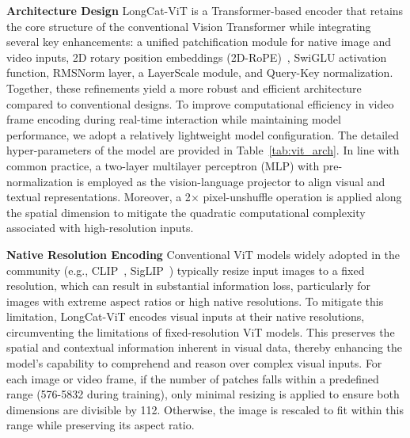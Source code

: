 \documentclass{article}
\begin{document}
\textbf{Architecture Design}
LongCat-ViT is a Transformer-based encoder that retains the core structure of the conventional Vision Transformer while integrating several key enhancements: a unified patchification module for native image and video inputs, 2D rotary position embeddings (2D-RoPE)~\citep{su2024roformer}, SwiGLU activation function, RMSNorm layer, a LayerScale module, and Query-Key normalization. Together, these refinements yield a more robust and efficient architecture compared to conventional designs.
To improve computational efficiency in video frame encoding during real-time interaction while maintaining model performance, we adopt a relatively lightweight model configuration.
The detailed hyper-parameters of the model are provided in Table~\ref{tab:vit_arch}.
In line with common practice, a two-layer multilayer perceptron (MLP) with pre-normalization is employed as the vision-language projector to align visual and textual representations. 
Moreover, a 2$\times$ pixel-unshuffle operation is applied along the spatial dimension to mitigate the quadratic computational complexity associated with high-resolution inputs.
\begin{table}[ht]
  \caption{Detailed architectural configuration for LongCat-ViT.}
  \centering
  \renewcommand{\arraystretch}{1.1}
   \label{tab:vit_arch}
\end{table}

\textbf{Native Resolution Encoding}
Conventional ViT models widely adopted in the community (e.g., CLIP~\citep{radford2021clip}, SigLIP~\citep{zhai2023sigmoid}) typically resize input images to a fixed resolution, which can result in substantial information loss, particularly for images with extreme aspect ratios or high native resolutions.
To mitigate this limitation, LongCat-ViT encodes visual inputs at their native resolutions, circumventing the limitations of fixed-resolution ViT models. This preserves the spatial and contextual information inherent in visual data, thereby enhancing the model’s capability to comprehend and reason over complex visual inputs.
For each image or video frame, if the number of patches falls within a predefined range (576-5832 during training), only minimal resizing is applied to ensure both dimensions are divisible by 112. Otherwise, the image is rescaled to fit within this range while preserving its aspect ratio.
\end{document}
